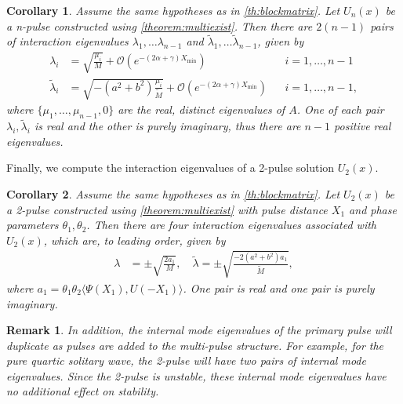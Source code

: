 \documentclass[12pt]{elsarticle}
\newtheorem{corollary}{Corollary}
\newtheorem{remark}{Remark}
\begin{document}
\begin{corollary}\label{corr:multiunstable}
Assume the same hypotheses as in \cref{th:blockmatrix}. Let $U_n(x)$ be a n-pulse constructed using \cref{theorem:multiexist}. Then there are $2(n-1)$ pairs of interaction eigenvalues $\lambda_1, \dots \lambda_{n-1}$ and $\tilde{\lambda}_1, \dots \tilde{\lambda}_{n-1}$, given by
\begin{equation}\label{inteigs}
\begin{aligned}
\lambda_i &= \sqrt{\frac{\mu_i}{M}} + \mathcal{O}\left( e^{-(2 \alpha + \gamma)X_{\min} } \right) && i = 1, \dots, n-1 \\
\tilde{\lambda}_i &= \sqrt{-(a^2 + b^2) \frac{\mu_i}{\tilde{M}}} + \mathcal{O}\left( e^{-(2 \alpha + \gamma)X_{\min} } \right) && i = 1, \dots, n-1,
\end{aligned}
\end{equation}
where $\{ \mu_1,\dots,\mu_{n-1}, 0\}$ are the real, distinct eigenvalues of $A$. One of each pair $\lambda_i, \tilde{\lambda}_i$ is real and the other is purely imaginary, thus there are $n-1$ positive real eigenvalues.
\end{corollary}

Finally, we compute the interaction eigenvalues of a 2-pulse solution $U_2(x)$.

\begin{corollary}\label{corr:2pstab}
Assume the same hypotheses as in \cref{th:blockmatrix}. Let $U_2(x)$ be a 2-pulse constructed using \cref{theorem:multiexist} with pulse distance $X_1$ and phase parameters $\theta_1, \theta_2$. Then there are four interaction eigenvalues associated with $U_2(x)$, which are, to leading order, given by
\begin{equation}\label{inteigpred}
\begin{aligned}
\lambda &= \pm \sqrt{ \frac{2 a_1}{M} }, \quad
\tilde{\lambda} = \pm \sqrt{ \frac{-2 (a^2 + b^2) a_1}{\tilde{M}} },
\end{aligned}
\end{equation}
where $a_1 = \theta_1 \theta_2 \langle \Psi(X_1), U(-X_1) \rangle$. One pair is real and one pair is purely imaginary.
\end{corollary}

\begin{remark}In addition, the internal mode eigenvalues of the primary pulse will duplicate as pulses are added to the multi-pulse structure. For example, for the pure quartic solitary wave, the 2-pulse will have two pairs of internal mode eigenvalues. Since the 2-pulse is unstable, these internal mode eigenvalues have no additional effect on stability.
\end{remark}
\end{document}
